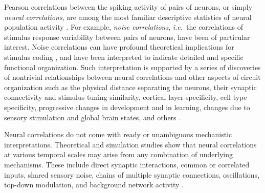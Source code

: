 Pearson correlations between the spiking activity of pairs of neurons, or simply \emph{neural correlations}, are among the most familiar descriptive statistics of neural population activity \citep{Cohen:2011}.  For example, \emph{noise correlations}, \emph{i.e.}~the correlations of stimulus response variability between pairs of neurons, have been of particular interest.  Noise correlations can have profound theoretical implications for stimulus coding \citep{Zohary:1994,Abbott:1999,Averbeck:2006,Berens:2011}, and have been interpreted to indicate detailed and specific functional organization. Such interpretation is supported by a series of discoveries of nontrivial relationships between neural correlations and other aspects of circuit organization such as the physical distance separating the neurons, their synaptic connectivity and stimulus tuning similarity, cortical layer specificity, cell-type specificity, progressive changes in development and in learning, changes due to sensory stimulation and global brain states, and others \citep{Kohn:2005,Smith:2008,Kohn:2009,Goard:2009,Golshani:2009,Renart:2010,Ecker:2010,Ko:2011,Smith:2013,Denman:2013}. 

Neural correlations do not come with ready or unambiguous mechanistic interpretations.  Theoretical and simulation studies show that neural correlations at various temporal scales may arise from any combination of underlying mechanisms.  These include direct synaptic interactions, common or correlated inputs, shared sensory noise, chains of multiple synaptic connections, oscillations, top-down modulation, and background network activity \citep{Perkel:1967b,Shadlen:1998,Salinas:2001,Ostojic:2009,Rosenbaum:2011}.

